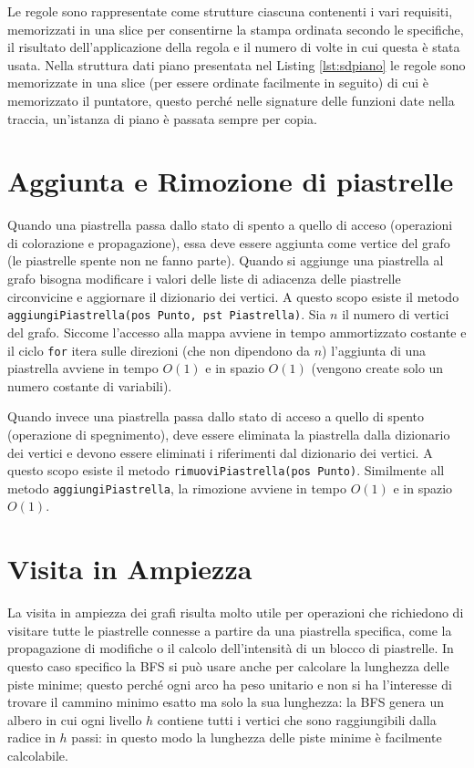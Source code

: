 \documentclass[a4paper,12pt]{article}
\begin{document}
	Le regole sono rappresentate come strutture ciascuna contenenti i vari requisiti, memorizzati in una slice per consentirne la stampa ordinata secondo le specifiche, il risultato dell'applicazione della regola e il numero di volte in cui questa è stata usata.
	Nella struttura dati piano presentata nel Listing \ref{lst:sdpiano} le regole sono memorizzate in una slice (per essere ordinate facilmente in seguito) di cui è memorizzato il puntatore, questo perché nelle signature delle funzioni date nella traccia, un'istanza di piano è passata sempre per copia.

	\section{Aggiunta e Rimozione di piastrelle}
	Quando una piastrella passa dallo stato di spento a quello di acceso (operazioni di colorazione e propagazione), essa deve essere aggiunta come vertice del grafo (le piastrelle spente non ne fanno parte).
	Quando si aggiunge una piastrella al grafo bisogna modificare i valori delle liste di adiacenza delle piastrelle circonvicine e aggiornare il dizionario dei vertici.
	A questo scopo esiste il metodo \texttt{aggiungiPiastrella(pos Punto, pst Piastrella)}.
	Sia \(n\) il numero di vertici del grafo.
	Siccome l'accesso alla mappa avviene in tempo ammortizzato costante e il ciclo \texttt{for} itera sulle direzioni (che non dipendono da \(n\)) l'aggiunta di una piastrella avviene in tempo \(O(1)\) e in spazio \(O(1)\) (vengono create solo un numero costante di variabili).
	
	Quando invece una piastrella passa dallo stato di acceso a quello di spento (operazione di spegnimento), deve essere eliminata la piastrella dalla dizionario dei vertici e devono essere eliminati i riferimenti dal dizionario dei vertici.
	A questo scopo esiste il metodo \texttt{rimuoviPiastrella(pos Punto)}.
	Similmente all metodo \texttt{aggiungiPiastrella}, la rimozione avviene in tempo \(O(1)\) e in spazio \(O(1)\).
	
	
	
	\section{Visita in Ampiezza}\label{sec:bfs}
	La visita in ampiezza dei grafi risulta molto utile per operazioni che richiedono di visitare tutte le piastrelle connesse a partire da una piastrella specifica, come la propagazione di modifiche o il calcolo dell'intensità di un blocco di piastrelle.
	In questo caso specifico la BFS si può usare anche per calcolare la lunghezza delle piste minime; questo perché ogni arco ha peso unitario e non si ha l'interesse di trovare il cammino minimo esatto ma solo la sua lunghezza: la BFS genera un albero in cui ogni livello \(h\) contiene tutti i vertici che sono raggiungibili dalla radice in \(h\) passi: in questo modo la lunghezza delle piste minime è facilmente calcolabile.
	
\end{document}
